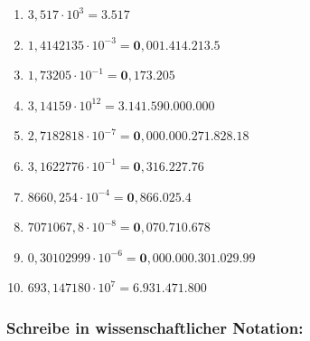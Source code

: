 \documentclass[a4paper,12pt]{article} %
\begin{document}
\begin{enumerate}[label=\alph*)]

  \item \(3,517 \cdot 10^3 = \mathbf{3.517}\) %

  \item \(1,4142135 \cdot 10^{-3} = \mathbf{0,001.414.213.5}\) %

  \item \(1,73205 \cdot 10^{-1} = \mathbf{0,173.205}\) %

  \item \(3,14159 \cdot 10^{12} = \mathbf{3.141.590.000.000}\) %

  \item \(2,7182818 \cdot 10^{-7} = \mathbf{0,000.000.271.828.18}\) %

  \item \(3,1622776 \cdot 10^{-1} = \mathbf{0,316.227.76}\) %

  \item \(8660,254 \cdot 10^{-4} = \mathbf{0,866.025.4}\) %

  \item \(7071067,8 \cdot 10^{-8} = \mathbf{0,070.710.678}\) %

  \item \(0,30102999 \cdot 10^{-6} = \mathbf{0,000.000.301.029.99}\) %

  \item \(693,147180 \cdot 10^7 = \mathbf{6.931.471.800}\) %

\end{enumerate}

\subsubsection{Schreibe in wissenschaftlicher Notation:} %
\end{document}
